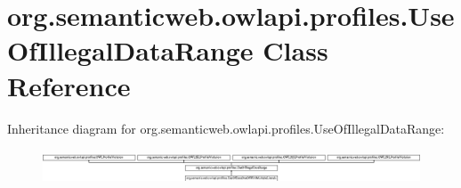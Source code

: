 \hypertarget{classorg_1_1semanticweb_1_1owlapi_1_1profiles_1_1_use_of_illegal_data_range}{\section{org.\-semanticweb.\-owlapi.\-profiles.\-Use\-Of\-Illegal\-Data\-Range Class Reference}
\label{classorg_1_1semanticweb_1_1owlapi_1_1profiles_1_1_use_of_illegal_data_range}
}
Inheritance diagram for org.\-semanticweb.\-owlapi.\-profiles.\-Use\-Of\-Illegal\-Data\-Range\-:\begin{figure}[H]
\begin{center}
\leavevmode
\includegraphics[height=1.016949cm]{classorg_1_1semanticweb_1_1owlapi_1_1profiles_1_1_use_of_illegal_data_range}
\end{center}
\end{figure}
